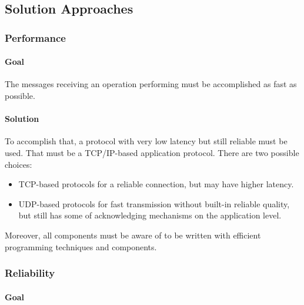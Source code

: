 \hypertarget{solution-approaches}{%
\subsection{Solution Approaches}\label{solution-approaches}}

\hypertarget{performance}{%
\subsubsection{Performance}\label{performance}}

\hypertarget{goal}{%
\paragraph{Goal}\label{goal}}

The messages receiving an operation performing must be accomplished as
fast as possible.

\hypertarget{solution}{%
\paragraph{Solution}\label{solution}}

To accomplish that, a protocol with very low latency but still reliable
must be used. That must be a TCP/IP-based application protocol. There
are two possible choices:

\begin{itemize}
\tightlist
\item
  TCP-based protocols for a reliable connection, but may have higher
  latency.
\item
  UDP-based protocols for fast transmission without built-in reliable
  quality, but still has some of acknowledging mechanisms on the
  application level.
\end{itemize}

Moreover, all components must be aware of to be written with efficient
programming techniques and components.

\hypertarget{reliability}{%
\subsubsection{Reliability}\label{reliability}}

\hypertarget{goal-1}{%
\paragraph{Goal}\label{goal-1}}

